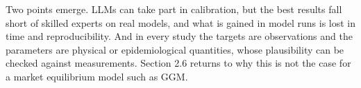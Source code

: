 Two points emerge.
LLMs can take part in calibration, but the best results fall short of skilled experts on real models, and what is gained in model runs is lost in time and reproducibility.
And in every study the targets are observations and the parameters are physical or epidemiological quantities, whose plausibility can be checked against measurements.
Section 2.6 returns to why this is not the case for a market equilibrium model such as GGM.
